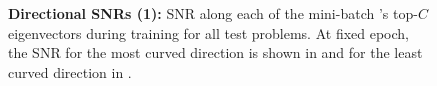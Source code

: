 \begin{figure}[p]
\vspace{-2mm}

\caption{\textbf{Directional SNRs (1):}
SNR along each of the mini-batch \ggn{}'s top-$C$ eigenvectors during training for all test problems.
At fixed epoch, the SNR for the most curved direction is shown in
{\protect{}}
and for the least curved direction in
{\protect{}}.
}

\label{fig:directional_derivatives_1}
\end{figure}






